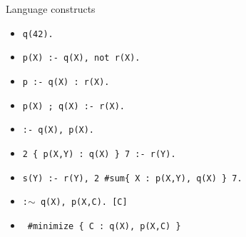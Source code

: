 \begin{frame}[fragile]{Language constructs}
  \bigskip
  \begin{itemize}\itemsep 5pt
  \item {}                 \hfill\texttt{q(42).}
  \item {}                 \hfill\texttt{p(X) :- q(X), not r(X).}
  \item {}  \hfill\texttt{p :- q(X) : r(X).}
  \item {}           \hfill\texttt{p(X) ; q(X) :- r(X).}
  \item {} \hfill\texttt{:- q(X), p(X).}
  \item {}                \hfill\texttt{2 \{ p(X,Y) : q(X) \} 7 :- r(Y).}
  \item {}            \hfill\texttt{s(Y) :- r(Y), 2 \#sum\{ X : p(X,Y), q(X) \} 7.}
    \bigskip
  \item {} \hfill \texttt{:$\mathtt{\sim}$ q(X), p(X,C). [C]}
  \item[]\ \hfill\texttt{\#minimize \{ C : q(X), p(X,C) \}}
\end{itemize}
\end{frame}
%
